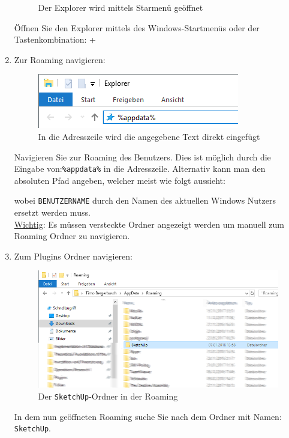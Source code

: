 \documentclass{book}
\newcommand{\sketchup}{\texttt{SketchUp}\xspace}
\begin{document}
\begin{enumerate}
\begin{figure}[H]
							\caption{Der Explorer wird mittels Starmenü geöffnet}
						\end{figure}
						Öffnen Sie den Explorer mittels des Windows-Startmenüs oder der Tastenkombination: +
						\label{explorer oeffnen}
					\item Zur Roaming navigieren:\\
						\begin{figure}[H]
							\centering
							\includegraphics[scale=0.6]{pics/plugins-ordner/appdata-eingeben.png}
							\caption{In die Adresszeile wird die angegebene Text direkt eingefügt}
						\end{figure}						
						Navigieren Sie zur Roaming des Benutzers. Dies ist möglich durch die Eingabe von:\texttt{\%appdata\%} in die Adresszeile. Alternativ kann man den absoluten Pfad angeben, welcher meist wie folgt aussieht:
						
						wobei \texttt{BENUTZERNAME} durch den Namen des aktuellen Windows Nutzers ersetzt werden muss.\\
						\underline{Wichtig}: Es müssen versteckte Ordner angezeigt werden um manuell zum Roaming Ordner zu navigieren.
					\item Zum Plugins Ordner navigieren:
						\begin{figure}[H]
							\centering
							\includegraphics[scale=0.6]{pics/plugins-ordner/Sketchup-Ordner.png}
							\caption{Der \sketchup-Ordner in der Roaming}
						\end{figure}
						In dem nun geöffneten Roaming suche Sie nach dem Ordner mit Namen: \sketchup .

\end{enumerate}
\end{document}

